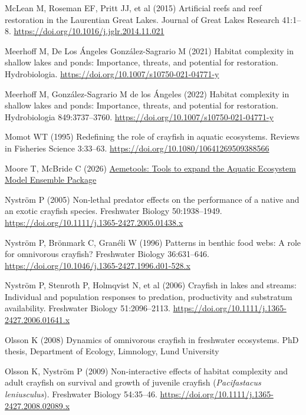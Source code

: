 \documentclass[
  12pt,
  a4paper,
  oneside]{scrbook}
\newlength{\cslhangindent}
\newenvironment{CSLReferences}[2] %
 {\begin{list}{}{%
  \setlength{\itemindent}{0pt}
  \setlength{\leftmargin}{0pt}
  \setlength{\parsep}{0pt}
  \ifodd #1
   \setlength{\leftmargin}{\cslhangindent}
   \setlength{\itemindent}{-1\cslhangindent}
  \fi
  \setlength{\itemsep}{#2\baselineskip}}}
 {\end{list}}
\begin{document}
\begin{CSLReferences}{1}{1}
McLean M, Roseman EF, Pritt JJ, et al (2015) Artificial reefs and reef
restoration in the {Laurentian Great Lakes}. Journal of Great Lakes
Research 41:1--8. \url{https://doi.org/10.1016/j.jglr.2014.11.021}

Meerhoff M, De Los Ángeles González-Sagrario M (2021) Habitat complexity
in shallow lakes and ponds: Importance, threats, and potential for
restoration. Hydrobiologia.
\url{https://doi.org/10.1007/s10750-021-04771-y}

Meerhoff M, González-Sagrario M de los Ángeles (2022) Habitat complexity
in shallow lakes and ponds: Importance, threats, and potential for
restoration. Hydrobiologia 849:3737--3760.
\url{https://doi.org/10.1007/s10750-021-04771-y}

Momot WT (1995) Redefining the role of crayfish in aquatic ecosystems.
Reviews in Fisheries Science 3:33--63.
\url{https://doi.org/10.1080/10641269509388566}

Moore T, McBride C (2026)
\href{https://limnotrack.com/aemetools/}{Aemetools: {Tools} to expand
the {Aquatic Ecosystem Model Ensemble Package}}

Nyström P (2005) Non‐lethal predator effects on the performance of a
native and an exotic crayfish species. Freshwater Biology 50:1938--1949.
\url{https://doi.org/10.1111/j.1365-2427.2005.01438.x}

Nyström P, Brönmark C, Granéli W (1996) Patterns in benthic food webs: A
role for omnivorous crayfish? Freshwater Biology 36:631--646.
\url{https://doi.org/10.1046/j.1365-2427.1996.d01-528.x}

Nyström P, Stenroth P, Holmqvist N, et al (2006) Crayfish in lakes and
streams: Individual and population responses to predation, productivity
and substratum availability. Freshwater Biology 51:2096--2113.
\url{https://doi.org/10.1111/j.1365-2427.2006.01641.x}

Olsson K (2008) Dynamics of omnivorous crayfish in freshwater
ecosystems. PhD thesis, Department of Ecology, Limnology, Lund
University

Olsson K, Nyström P (2009) Non-interactive effects of habitat complexity
and adult crayfish on survival and growth of juvenile crayfish
({\emph{Pacifastacus leniusculus}}). Freshwater Biology 54:35--46.
\url{https://doi.org/10.1111/j.1365-2427.2008.02089.x}


\end{CSLReferences}
\end{document}
